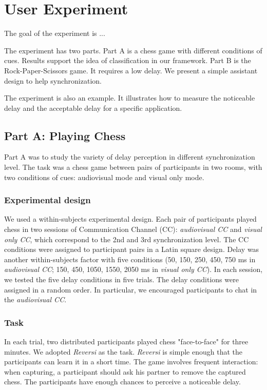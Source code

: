 \section{User Experiment}

The goal of the experiment is ...

The experiment has two parts. Part A is a chess game with different conditions of cues. Results support the idea of classification in our framework. Part B is the Rock-Paper-Scissors game. It requires a low delay. We present a simple assistant design to help synchronization.

The experiment is also an example. It illustrates how to measure the noticeable delay and the acceptable delay for a specific application.

\subsection{Part A: Playing Chess}

Part A was to study the variety of delay perception in different synchronization level. The task was a chess game between pairs of participants in two rooms, with two conditions of cues: audiovisual mode and visual only mode.

\subsubsection{Experimental design}

We used a within-subjects experimental design. Each pair of participants played chess in two sessions of Communication Channel (CC): \emph{audiovisual CC} and \emph{visual only CC}, which correspond to the 2nd and 3rd synchronization level. The CC conditions were assigned to participant pairs in a Latin square design. Delay was another within-subjects factor with five conditions (50, 150, 250, 450, 750 ms in \emph{audiovisual CC}; 150, 450, 1050, 1550, 2050 ms in \emph{visual only CC}). In each session, we tested the five delay conditions in five trials. The delay conditions were assigned in a random order. In particular, we encouraged participants to chat in the \emph{audiovisual CC}.

\subsubsection{Task}

In each trial, two distributed participants played chess "face-to-face" for three minutes. We adopted \emph{Reversi} as the task. \emph{Reversi} is simple enough that the participants can learn it in a short time. The game involves frequent interaction: when capturing, a participant should ask his partner to remove the captured chess. The participants have enough chances to perceive a noticeable delay.

